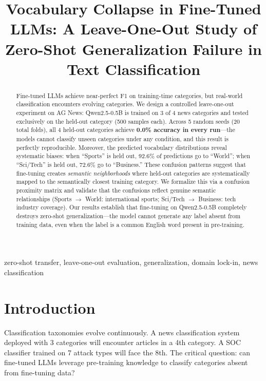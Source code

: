 \documentclass[journal]{IEEEtran}
\begin{document}
\title{Vocabulary Collapse in Fine-Tuned LLMs: A Leave-One-Out Study of Zero-Shot Generalization Failure in Text Classification}
\author{
}
\maketitle

\begin{abstract}
Fine-tuned LLMs achieve near-perfect F1 on training-time categories, but real-world classification encounters evolving categories. We design a controlled leave-one-out experiment on AG News: Qwen2.5-0.5B is trained on 3 of 4 news categories and tested exclusively on the held-out category (500 samples each). Across 5 random seeds (20 total folds), all 4 held-out categories achieve \textbf{0.0\% accuracy in every run}---the models cannot classify unseen categories under any condition, and this result is perfectly reproducible. Moreover, the predicted vocabulary distributions reveal systematic biases: when ``Sports'' is held out, 92.6\% of predictions go to ``World''; when ``Sci/Tech'' is held out, 72.6\% go to ``Business.'' These confusion patterns suggest that fine-tuning creates \emph{semantic neighborhoods} where held-out categories are systematically mapped to the semantically closest training category. We formalize this via a confusion proximity matrix and validate that the confusions reflect genuine semantic relationships (Sports $\to$ World: international sports; Sci/Tech $\to$ Business: tech industry coverage). Our results establish that fine-tuning on Qwen2.5-0.5B completely destroys zero-shot generalization---the model cannot generate any label absent from training data, even when the label is a common English word present in pre-training.
\end{abstract}
\begin{IEEEkeywords}
zero-shot transfer, leave-one-out evaluation, generalization, domain lock-in, news classification
\end{IEEEkeywords}

\section{Introduction}
Classification taxonomies evolve continuously. A news classification system deployed with 3 categories will encounter articles in a 4th category. A SOC classifier trained on 7 attack types will face the 8th. The critical question: can fine-tuned LLMs leverage pre-training knowledge to classify categories absent from fine-tuning data?
\end{document}
